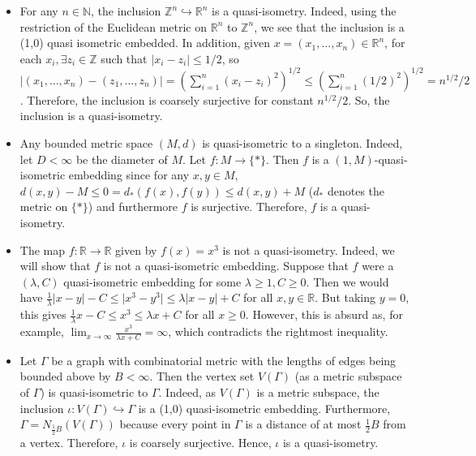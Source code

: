 \documentclass[12pt]{article}
\begin{document}
 	\begin{itemize}
 		\item For any $n \in \mathbb{N}$, the inclusion $\mathbb{Z}^n \hookrightarrow \mathbb{R}^n$ is a quasi-isometry. Indeed, using the restriction of the Euclidean metric on $\mathbb{R}^n$ to $\mathbb{Z}^n$, we see that the inclusion is a (1,0) quasi isometric embedded. In addition, given $x = (x_1,...,x_n) \in \mathbb{R}^n$, for each $x_i, \exists z_i \in \mathbb{Z}$ such that $\vert x_i - z_i \vert \leq 1/2$, so $\vert(x_1,...,x_n) - (z_1,...,z_n) \vert = (\sum_{i=1}^n (x_i - z_i)^2)^{1/2} \leq (\sum_{i=1}^n (1/2)^2)^{1/2} = n^{1/2}/2$. Therefore, the inclusion is coarsely surjective for constant $n^{1/2}/2$. So, the inclusion is a quasi-isometry. 
 		\item Any bounded metric space $(M,d)$ is quasi-isometric to a singleton. Indeed, let $D < \infty$ be the diameter of $M$. Let $f: M \rightarrow \{*\}$. Then $f$ is a $(1, M)$-quasi-isometric embedding since for any $x,y \in M$, $d(x,y) - M \leq 0 = d_*(f(x), f(y)) \leq d(x,y) + M$ ($d_*$ denotes the metric on $\{*\}$) and furthermore $f$ is surjective. Therefore, $f$ is a quasi-isometry. 
 		\item The map $f: \mathbb{R} \rightarrow \mathbb{R}$ given by $f(x) = x^3$ is not a quasi-isometry. Indeed, we will show that $f$ is not a quasi-isometric embedding. Suppose that $f$ were a $(\lambda, C)$ quasi-isometric embedding for some $\lambda \geq 1, C \geq 0$. Then we would have $\frac{1}{\lambda} \vert x - y \vert - C \leq \vert x^3 - y^3 \vert \leq \lambda \vert x - y \vert + C$ for all $x,y \in \mathbb{R}$. But taking $y = 0$, this gives $\frac{1}{\lambda}x - C \leq x^3 \leq \lambda x + C$ for all $x \geq 0$. However, this is absurd as, for example, $\lim_{x \rightarrow \infty} \frac{x^3}{\lambda x + C} = \infty$, which contradicts the rightmost inequality. 
 		\item Let $\Gamma$ be a graph with combinatorial metric with the lengths of edges being bounded above by $B < \infty$. Then the vertex set $V(\Gamma)$ (as a metric subspace of $\Gamma$) is quasi-isometric to $\Gamma$. Indeed, as $V(\Gamma)$ is a metric subspace, the inclusion $\iota: V(\Gamma) \hookrightarrow \Gamma$ is a (1,0) quasi-isometric embedding. Furthermore, $\Gamma = N_{\frac{1}{2} B} (V(\Gamma))$ because every point in $\Gamma$ is a distance of at most $\frac{1}{2} B$ from a vertex. Therefore, $\iota$ is coarsely surjective. Hence, $\iota$ is a quasi-isometry.
 	\end{itemize}
 
\end{document}
